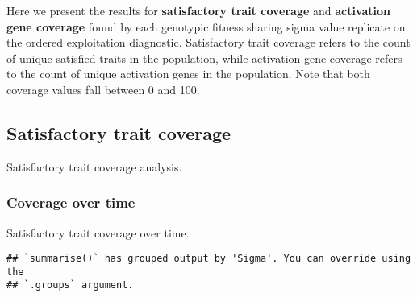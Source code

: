 \documentclass[]{book}
\newenvironment{Shaded}{\begin{snugshade}}{\end{snugshade}}
\newcommand{\DataTypeTok}[1]{\textcolor[rgb]{0.13,0.29,0.53}{#1}}
\newcommand{\KeywordTok}[1]{\textcolor[rgb]{0.13,0.29,0.53}{\textbf{#1}}}
\newcommand{\NormalTok}[1]{#1}
\newcommand{\OperatorTok}[1]{\textcolor[rgb]{0.81,0.36,0.00}{\textbf{#1}}}
\newcommand{\StringTok}[1]{\textcolor[rgb]{0.31,0.60,0.02}{#1}}
\begin{document}
Here we present the results for \textbf{satisfactory trait coverage} and \textbf{activation gene coverage} found by each genotypic fitness sharing sigma value replicate on the ordered exploitation diagnostic.
Satisfactory trait coverage refers to the count of unique satisfied traits in the population, while activation gene coverage refers to the count of unique activation genes in the population.
Note that both coverage values fall between 0 and 100.

\hypertarget{satisfactory-trait-coverage-2}{%
\subsection{Satisfactory trait coverage}\label{satisfactory-trait-coverage-2}}

Satisfactory trait coverage analysis.

\hypertarget{coverage-over-time-8}{%
\subsubsection{Coverage over time}\label{coverage-over-time-8}}

Satisfactory trait coverage over time.

\begin{Shaded}
\end{Shaded}

\begin{verbatim}
## `summarise()` has grouped output by 'Sigma'. You can override using the
## `.groups` argument.
\end{verbatim}
\end{document}

